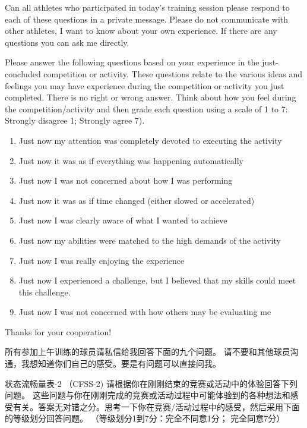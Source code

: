 \begin{CJK}{UTF8}{gbsn}
  Can all athletes who participated in today's training session please respond to each of these questions in a private message. Please do not communicate with other athletes, I want to know about your own experience.  If there are any questions you can ask me directly.

  Please answer the following questions based on your experience in the just-concluded competition or activity. These questions relate to the various ideas and feelings you may have experience during the competition or activity you just completed. There is no right or wrong answer. Think about how you feel during the competition/activity and then grade each question using a scale of 1 to 7: Strongly disagree 1; Strongly agree 7).


  \begin{enumerate}
    \item Just now my attention was completely devoted to executing the activity
    \item Just now it was as if everything was happening automatically
    \item Just now I was not concerned about how I was performing
    \item Just now it was as if time changed (either slowed or accelerated)
    \item Just now I was clearly aware of what I wanted to achieve
    \item Just now my abilities were matched to the high demands of the activity
    \item Just now I was really enjoying the experience
    \item Just now I experienced a challenge, but I believed that my skills could meet this challenge.
    \item Just now I was not concerned with how others may be evaluating me
  \end{enumerate}

  Thanks for your cooperation!




  所有参加上午训练的球员请私信给我回答下面的九个问题。
  请不要和其他球员沟通，我想知道你们自己的感受。要是有问题可以直接问我。


  状态流畅量表-2 （CFSS-2)
  请根据你在刚刚结束的竞赛或活动中的体验回答下列问题。 这些问题与你在刚刚完成的竞赛或活动过程中可能体验到的各种想法和感受有关。答案无对错之分。思考一下你在竞赛/活动过程中的感受，然后采用下面的等级划分回答问题。  （等级划分1到7分：完全不同意1分； 完全同意7分）


\end{CJK}
